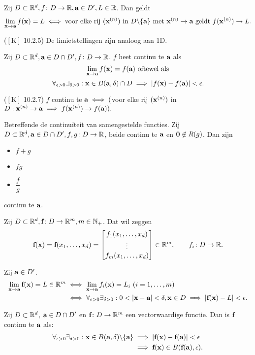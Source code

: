 \documentclass{2wa40summary}
\begin{document}
	\theorem Zij $D \subset \mathbb{R}^d, f\colon D\to \mathbb{R}, {\textbf{a}} \in D', L \in \mathbb{R}$. Dan geldt
	\[ \lim_{{\textbf{x}} \to {\textbf{a}}} f({\textbf{x}})=L \iff \text{voor elke rij } ({\textbf{x}}^{(n)}) \text{ in } D\backslash\{{\textbf{a}}\} \text{ met } {\textbf{x}}^{(n)}\to {\textbf{a}} \text{ geldt } f({\textbf{x}}^{(n)}) \to L.\]
	
	\opm ($\left[\text{K}\right]$ 10.2.5) De limietstellingen zijn analoog aan 1D.
	
	 Zij $D \subset \mathbb{R}^d, {\textbf{a}}\in D\cap D',f\colon D\to \mathbb{R}$. $f$ heet continu te ${\textbf{a}}$ als \[\lim_{{\textbf{x}}\to {\textbf{a}}}f({\textbf{x}})=f({\textbf{a}}) \text{ oftewel als}\]
	\[\forall _{\epsilon >0} \exists _{\delta >0}: \x \in B(\a,\delta)\cap D \implies |f(\x)-f(\a)|<\epsilon.\]
	
	\theorem ($\left[\text{K}\right]$ 10.2.7)
	$f$ continu te ${\textbf{a}}\iff ($voor elke rij $({\textbf{x}}^{(n)})$ in $D: {\textbf{x}}^{(n)}\to {\textbf{a}} \implies f({\textbf{x}}^{(n)}) \to f({\textbf{a}}) ).$
	
	\theorem Betreffende de continu\"iteit van samengestelde functies. Zij
	$D \subset \mathbb{R}^d, {\textbf{a}} \in D\cap D', f,g\colon D\to \mathbb{R}$, beide continu te ${\textbf{a}}$ en ${\textbf{0}} \not \in R(g)$.
	Dan zijn
	\begin{itemize}
		\item $f+g$
		\item $fg$
		\item $\dfrac{f}{g}$
	\end{itemize}
	continu te ${\textbf{a}}$.
	
	Zij $D \subset \mathbb{R}^d, {\textbf{f}}\colon D\to \mathbb{R}^m, m \in \mathbb{N}_+$. Dat wil zeggen
	\[{\textbf{f}}({\textbf{x}})={\textbf{f}}(x_1,\dots , x_d) =
	\begin{bmatrix}
	f_1(x_1,\dots , x_d) \\
	\vdots \\
	f_m(x_1,\dots , x_d) \\
	\end{bmatrix}\in\mathbb{R}^m, \qquad f_i\colon D\to \mathbb{R}.\]
	
	 Zij ${\textbf{a}} \in D'$.
	\begin{align*}
	\lim_{\x\to\a}\f(\x)=L \in \reals^m  &\iff \lim_{\x\to\a}f_i(\x)=L_i \ (i=1,\ldots ,m) \\
	&\iff \forall _{\epsilon >0} \exists _{\delta >0}: 0<|\x-\a|<\delta, \x\in D \implies \abs{\f(\x)-L}<\epsilon.
	\end{align*}
	
	 Zij $D \subset \mathbb{R}^d$, ${\textbf{a}} \in D \cap D'$ en ${\textbf{f}}\colon D \to \mathbb{R}^m$ een vectorwaardige functie.
	Dan is ${\textbf{f}}$ continu te ${\textbf{a}}$ als:
	\begin{align*}
	\forall _{\epsilon >0} \exists _{\delta >0}: \x\in B(\a,\delta)\backslash\set{\a} &\implies |\f(\x)-\f(\a)|<\epsilon \\
	&\implies \f(\x) \in B(\f(\a),\epsilon).
	\end{align*}
	
\end{document}
